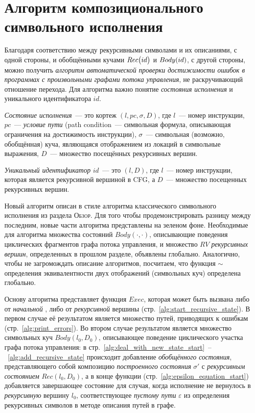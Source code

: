 \section{Алгоритм композиционального символьного исполнения}

Благодаря соответствию между рекурсивными символами и их описаниями, с одной стороны, и обобщёнными кучами $Rec\big(id\big)$ и $Body{}(id)$, с другой стороны, можно 
получить \emph{алгоритм автоматической проверки достижимости ошибок в программах с произвольными графами потока управления}, не раскручивающий отношение перехода. Для алгоритма важно понятие \emph{состояния исполнения} и уникального идентификатора $id$.

\begin{defn}
\emph{Состояние исполнения}~--- это кортеж $(l,pc,\sigma,D)$, где $l$~--- номер инструкции,
$pc$~--- \emph{условие пути} (\foreignlanguage{english}{path condition}~--- символьная формула, описывающая ограничения на достижимость инструкции), $\sigma$~--- символьная (возможно, обобщённая) куча, являющаяся отображением из локаций в символьные выражения, $D$~--- множество посещённых рекурсивных вершин.

\emph{Уникальный идентификатор $id$}~--- это $(l,D)$, где $l$~--- номер инструкции, которая является рекурсивной вершиной в CFG, а $D$~--- множество посещенных рекурсивных вершин.
\end{defn}

Новый алгоритм описан в стиле алгоритма классического символьного исполнения из раздела \textsc{Обзор}. Для того чтобы продемонстрировать разницу между последним, новые части алгоритма представлены на зеленом фоне. Необходимые для алгоритма множества состояний $Body(\cdot,\cdot)$, описывающие поведения циклических фрагментов графа потока управления, и множество $RV$ \emph{рекурсивных вершин}, определенных в прошлом разделе, объявлены глобально. Аналогично, чтобы не загромождать описание алгоритмов, посчитаем, что функция $\sim$ определения эквивалентности двух отображений (символьных куч) определена глобально.

Основу алгоритма представляет функция $Exec$, которая может быть вызвана либо от \emph{начальной} , 
либо от \emph{рекурсивной} вершины (стр.~\ref{alg:start_recursive_state}). В первом случае её результатом является  множество путей, приводящих к ошибкам (стр.~\ref{alg:print_errors}).
Во втором случае результатом является множество символьных куч $Body(l_0,D_0)$, описывающее поведение циклического участка графа потока управления:
в стр.~\ref{alg:deal_with_new_state_start}~--~\ref{alg:add_recursive_state} 
происходит добавление \emph{обобщённого состояния}, представляющего собой композицию \emph{построенного состояния} $\sigma'$ с \emph{рекурсивным состоянием} $Rec(l_0,D_0)$, 
а в конце функции (стр.~\ref{alg:epsilon_equation_start}) добавляется завершающее состояние для случая, 
когда исполнение не вернулось в \emph{рекурсивную} вершину $l_0$,
соответствующее \emph{пустому пути} $\varepsilon$ из определения рекурсивных символов в методе описания путей в графе.


